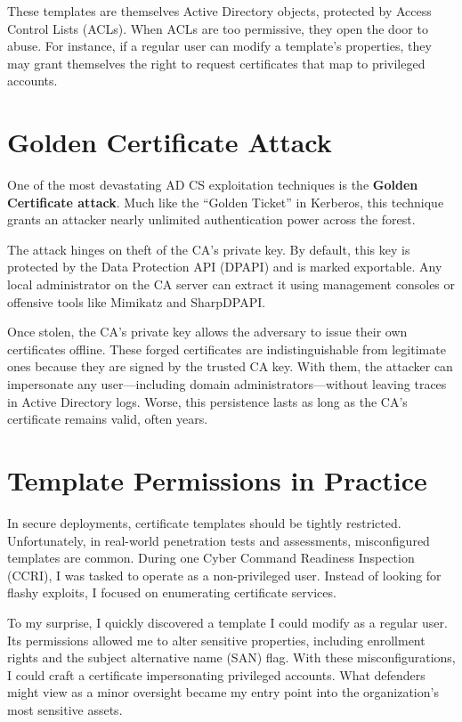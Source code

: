These templates are themselves Active Directory objects, protected by Access Control Lists (ACLs). When ACLs are too permissive, they open the door to abuse. For instance, if a regular user can modify a template’s properties, they may grant themselves the right to request certificates that map to privileged accounts.

\section{Golden Certificate Attack}

One of the most devastating AD CS exploitation techniques is the \textbf{Golden Certificate attack}. Much like the “Golden Ticket” in Kerberos, this technique grants an attacker nearly unlimited authentication power across the forest.

The attack hinges on theft of the CA’s private key. By default, this key is protected by the Data Protection API (DPAPI) and is marked exportable. Any local administrator on the CA server can extract it using management consoles or offensive tools like Mimikatz and SharpDPAPI.

Once stolen, the CA’s private key allows the adversary to issue their own certificates offline. These forged certificates are indistinguishable from legitimate ones because they are signed by the trusted CA key. With them, the attacker can impersonate any user—including domain administrators—without leaving traces in Active Directory logs. Worse, this persistence lasts as long as the CA’s certificate remains valid, often years.

\section{Template Permissions in Practice}

In secure deployments, certificate templates should be tightly restricted. Unfortunately, in real-world penetration tests and assessments, misconfigured templates are common. During one Cyber Command Readiness Inspection (CCRI), I was tasked to operate as a non-privileged user. Instead of looking for flashy exploits, I focused on enumerating certificate services.

To my surprise, I quickly discovered a template I could modify as a regular user. Its permissions allowed me to alter sensitive properties, including enrollment rights and the subject alternative name (SAN) flag. With these misconfigurations, I could craft a certificate impersonating privileged accounts. What defenders might view as a minor oversight became my entry point into the organization’s most sensitive assets.

